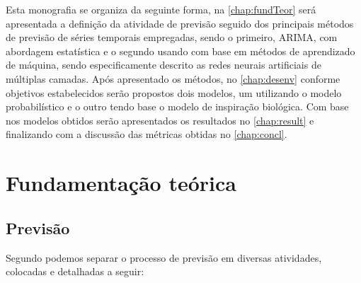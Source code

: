 \documentclass[
    12pt,
    oneside,
    a4paper,
    english,
    brazil
]{abntex2}
\begin{document}
Esta monografia se organiza da seguinte forma, na \autoref{chap:fundTeor} será 
apresentada a definição da atividade de previsão seguido dos principais métodos 
de previsão de séries temporais empregadas, sendo o primeiro, ARIMA, com 
abordagem estatística e o segundo usando com base em métodos de aprendizado de 
máquina, sendo especificamente descrito as redes neurais artificiais de 
múltiplas camadas. Após apresentado os métodos, no \autoref{chap:desenv} 
conforme objetivos estabelecidos serão propostos dois modelos, um utilizando o 
modelo probabilístico e o outro tendo base o modelo de inspiração biológica. Com 
base nos modelos obtidos serão apresentados os resultados no 
\autoref{chap:result} e finalizando com a discussão das métricas obtidas no 
\autoref{chap:concl}.

\chapter{Fundamentação teórica}\label{chap:fundTeor}

\section{Previsão}
Segundo  podemos separar o processo de previsão em diversas 
atividades, colocadas e detalhadas a seguir:
\end{document}
